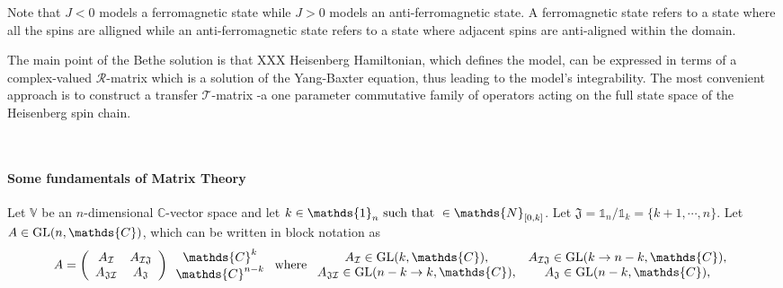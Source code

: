 \documentclass{homework}
\begin{document}
Note that $J < 0$ models a ferromagnetic state while $J > 0$ models an anti-ferromagnetic state. A ferromagnetic state refers to a state where all the spins are alligned while an anti-ferromagnetic state refers to a state where adjacent spins are anti-aligned within the domain. \\

\begin{tcolorbox}[colback =yellow,title = Physical Context]

The main point of the Bethe solution is that XXX Heisenberg Hamiltonian, which defines the model, can be expressed in terms of a complex-valued $\bm{\mathcal R}$-matrix which is a solution of the Yang-Baxter equation, thus leading to the model's integrability. The most convenient approach is to construct a transfer $\bm{\mathcal{T}}$-matrix -a one parameter commutative family of operators acting on the full state space of the Heisenberg spin chain. 

\end{tcolorbox}

\blanky \\ 

\paragraph{\textbf{Some fundamentals of Matrix Theory}}

Let $\mathds{V}$ be an $n$-dimensional $\mathds{C}$-vector space and let $k \in \mathds{1}_n \textnormal{ such that } \in \mathds{N}_{[0, k]}$. Let $\mathfrak{J} = \mathds{1}_n / \mathds{1}_k = \{k+1,\cdots, n\}$. Let $A \in \textnormal{GL}(n, \mathds{C})$, which can be written in block notation as 
\begin{equation}
    A = \left(\begin{array}{cc}
        A_{\mathcal{I}} & A_{\mathcal{I} \mathfrak{J}}  \\
        A_{\mathfrak{J} \mathcal{I}} & A_{\mathfrak{J}}
    \end{array}\right) \begin{array}{c}
         \mathds{C}^k  \\
         \mathds{C}^{n-k}
    \end{array} \textnormal{ where } \begin{array}{cc}
        A_{\mathcal{I}} \in \textnormal{GL}(k, \mathds{C}),  &  A_{\mathcal{I} \mathfrak{J}} \in \textnormal{GL}(k \rightarrow n-k, \mathds{C}), \\
        A_{\mathfrak{J} \mathcal{I}} \in  \textnormal{GL}(n-k \rightarrow k, \mathds{C}), & A_{\mathfrak{J}}  \in \textnormal{GL}(n-k, \mathds{C}),
    \end{array} 
\end{equation}
\end{document}
